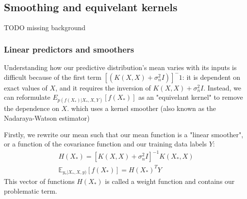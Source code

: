 \documentclass[10pt]{article}
\begin{document}
\subsection{Smoothing and equivelant kernels \cite{gp-ml}}
TODO missing background

\subsubsection{Linear predictors and smoothers}

Understanding how our predictive distribution's mean varies with its inputs is difficult because of the first term $[(K(X, X) + \sigma_n^2I)]^-1$: it is dependent on exact values of $X$, and it requires the inversion of $K(X, X) + \sigma^2_nI$. Instead, we can reformulate $E_{p(f(X_*)|X_*,X,Y)}[f(X_*)]$ as an "equivelant kernel" to remove the dependence on $X$. 
which uses a kernel smoother (also known as the Nadaraya-Watson estimator)  

Firstly, we rewrite our mean such that our mean function is a "linear smoother", or a function of the covariance function and our training data labels $Y$:
\begin{equation} \label{eq:gp_linear_smoother}
    \begin{aligned}
        H(X_*) = [K(X, X) + \sigma^2_nI]^{-1}K(X_*,X) \\
        \mathbb{E}_{y_*|X_*,X,y)}[f(X_*)] = H(X_*)^T Y
    \end{aligned}
\end{equation}
This vector of functions $H(X_*)$ is called a weight function and contains our problematic term. 
\end{document}
